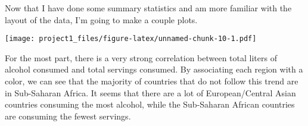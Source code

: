 \documentclass[]{article}
\newenvironment{Shaded}{\begin{snugshade}}{\end{snugshade}}
\newcommand{\KeywordTok}[1]{\textcolor[rgb]{0.13,0.29,0.53}{\textbf{#1}}}
\newcommand{\DataTypeTok}[1]{\textcolor[rgb]{0.13,0.29,0.53}{#1}}
\newcommand{\DecValTok}[1]{\textcolor[rgb]{0.00,0.00,0.81}{#1}}
\newcommand{\StringTok}[1]{\textcolor[rgb]{0.31,0.60,0.02}{#1}}
\newcommand{\OperatorTok}[1]{\textcolor[rgb]{0.81,0.36,0.00}{\textbf{#1}}}
\newcommand{\NormalTok}[1]{#1}
\begin{document}
Now that I have done some summary statistics and am more familiar with
the layout of the data, I'm going to make a couple plots.

\begin{Shaded}
\end{Shaded}

\texttt{[image: project1\_files/figure-latex/unnamed-chunk-10-1.pdf]}

For the most part, there is a very strong correlation between total
liters of alcohol consumed and total servings consumed. By associating
each region with a color, we can see that the majority of countries that
do not follow this trend are in Sub-Saharan Africa. It seems that there
are a lot of European/Central Asian countries consuming the most
alcohol, while the Sub-Saharan African countries are consuming the
fewest servings.
\end{document}
